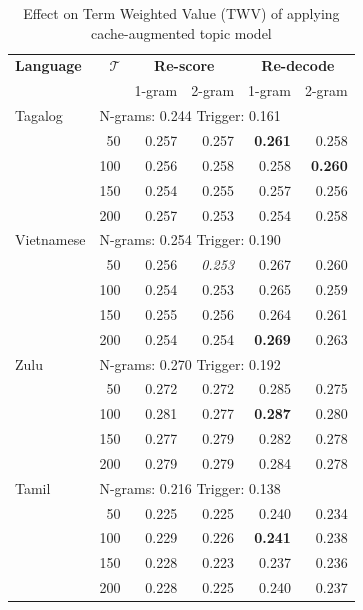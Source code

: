 \begin{table}
\centering
   \begin{tabular}{lrrrrr} \toprule
   \textbf{Language} & $\mathcal{T}$ &  \multicolumn{2}{c}{\textbf{Re-score}} & \multicolumn{2}{c}{\textbf{Re-decode}}\\ 
   & & 1-gram  & 2-gram & 1-gram  &  2-gram \\ \midrule 
   Tagalog & \multicolumn{5}{l}{ N-grams: 0.244 \hfill Trigger: 0.161 } \\ 
   \rowcolor{blue!5}	  & 50 & 0.257 & 0.257 & \textbf{0.261}  & 0.258 \\ 
		& 100 & 0.256 & 0.258 & 0.258 & \textbf{0.260} \\
		& 150 & 0.254 & 0.255 & 0.257 & 0.256 \\
		& 200 & 0.257 & 0.253 & 0.254 & 0.258 \\ \midrule
   Vietnamese & \multicolumn{5}{l}{ N-grams: 0.254 \hfill Trigger: 0.190 } \\
	 & 50 & 0.256 & \textit{0.253} & 0.267 & 0.260 \\
	 & 100 & 0.254 & 0.253 & 0.265 & 0.259 \\
	 & 150 & 0.255 & 0.256 & 0.264 & 0.261 \\
   \rowcolor{blue!5} & 200 & 0.254 & 0.254 & \textbf{0.269} & 0.263\\ \midrule
   Zulu & \multicolumn{5}{l}{ N-grams: 0.270 \hfill Trigger: 0.192 } \\
    & 50 & 0.272 & 0.272 & 0.285  & 0.275\\
   \rowcolor{blue!5} & 100 & 0.281 & 0.277 & \textbf{0.287} & 0.280 \\
	& 150 & 0.277 & 0.279 & 0.282  & 0.278 \\
	& 200 & 0.279  & 0.279 & 0.284 & 0.278 \\ \midrule
   Tamil & \multicolumn{5}{l}{ N-grams: 0.216 \hfill Trigger: 0.138 } \\	
	&  50 & 0.225 & 0.225 & 0.240  & 0.234 \\ 
   \rowcolor{blue!5} & 100 & 0.229 & 0.226 & \textbf{0.241} & 0.238 \\
	& 150 & 0.228 & 0.223 & 0.237 & 0.236 \\
	& 200 & 0.228 & 0.225 & 0.240 & 0.237 \\\bottomrule
	
    \end{tabular}
\caption[Effect of cache-augmented topic model on TWV]{Effect on Term Weighted Value (TWV) of applying cache-augmented topic model\label{fullRes}}
\end{table}

